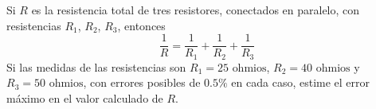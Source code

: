 \item Si $R$ es la resistencia total de tres resistores, conectados en paralelo, con resistencias $R_1$, $R_2$, $R_3$, entonces
\[ \frac{1}{R} = \frac{1}{R_1} + \frac{1}{R_2} + \frac{1}{R_3} \]
Si las medidas de las resistencias son $R_1 = 25 \text{ ohmios}$, $R_2 = 40 \text{ ohmios}$ y $R_3 = 50 \text{ ohmios}$, con errores posibles de $0.5\%$ en cada caso, estime el error máximo en el valor calculado de $R$.
